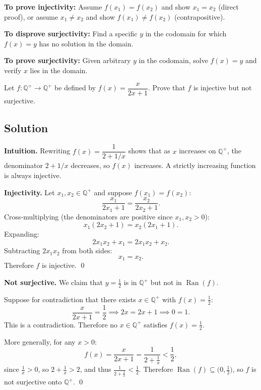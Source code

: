 \documentclass[12pt, a4paper]{article}
\newcommand{\Q}{\mathbb{Q}}
\begin{document}
\begin{theorybox}
\textbf{To prove injectivity:}\;
Assume $f(x_1) = f(x_2)$ and show $x_1 = x_2$ (direct proof),
or assume $x_1 \neq x_2$ and show $f(x_1) \neq f(x_2)$ (contrapositive).

\textbf{To disprove surjectivity:}\;
Find a specific $y$ in the codomain for which $f(x) = y$ has no solution in the domain.

\textbf{To prove surjectivity:}\;
Given arbitrary $y$ in the codomain, solve $f(x) = y$ and verify $x$ lies in the domain.
\end{theorybox}

\begin{problembox}
Let $f : \Q^+ \to \Q^+$ be defined by $f(x) = \dfrac{x}{2x+1}$.
Prove that $f$ is injective but not surjective.
\end{problembox}

\subsection*{Solution}

\textbf{Intuition.}\; Rewriting $f(x) = \dfrac{1}{2 + 1/x}$ shows that as $x$ increases on $\mathbb{Q}^+$, the denominator $2 + 1/x$ decreases, so $f(x)$ increases. A strictly increasing function is always injective.

\medskip

\textbf{Injectivity.}\;
Let $x_1, x_2 \in \Q^+$ and suppose $f(x_1) = f(x_2)$:
\[
  \frac{x_1}{2x_1 + 1} = \frac{x_2}{2x_2 + 1}.
\]
Cross-multiplying (the denominators are positive since $x_1, x_2 > 0$):
\[
  x_1(2x_2 + 1) = x_2(2x_1 + 1).
\]
Expanding:
\[
  2x_1 x_2 + x_1 = 2x_1 x_2 + x_2.
\]
Subtracting $2x_1 x_2$ from both sides:
\[
  x_1 = x_2.
\]
Therefore $f$ is injective. \qed

\bigskip
\textbf{Not surjective.}\;
We claim that $y = \frac{1}{2}$ is in $\Q^+$ but not in $\operatorname{Ran}(f)$.

Suppose for contradiction that there exists $x \in \Q^+$ with $f(x) = \frac{1}{2}$:
\[
  \frac{x}{2x+1} = \frac{1}{2} \implies 2x = 2x + 1 \implies 0 = 1.
\]
This is a contradiction. Therefore no $x \in \Q^+$ satisfies $f(x) = \frac{1}{2}$.

\medskip
More generally, for any $x > 0$:
\[
  f(x) = \frac{x}{2x+1} = \frac{1}{2 + \frac{1}{x}} < \frac{1}{2},
\]
since $\frac{1}{x} > 0$, so $2 + \frac{1}{x} > 2$, and thus $\frac{1}{2+\frac{1}{x}} < \frac{1}{2}$.
Therefore $\operatorname{Ran}(f) \subseteq \bigl(0, \frac{1}{2}\bigr)$, so $f$ is not surjective onto $\Q^+$. \qed
\end{document}
